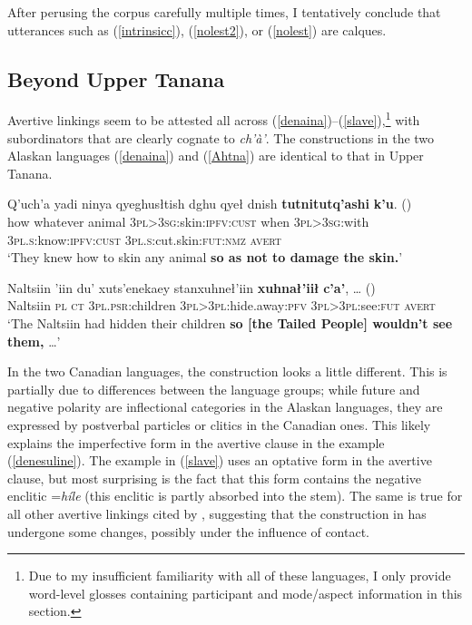 \documentclass[output=paper,colorlinks,citecolor=brown]{langscibook}
\begin{document}
After perusing the corpus carefully multiple times, I tentatively conclude that utterances such as (\ref{intrinsicc}), (\ref{nolest2}), or (\ref{nolest}) are  calques.


\subsection{Beyond Upper Tanana}
\label{subsection:avert-beyond}

Avertive linkings seem to be attested all across  (\ref{denaina})--(\ref{slave}),\footnote{Due to my insufficient familiarity with all of these languages, I only provide word-level glosses containing participant and mode/aspect information in this section.} with subordinators that are clearly cognate to  \textit{ch'à'}. The constructions in the two Alaskan languages  (\ref{denaina}) and  (\ref{Ahtna}) are identical to that in Upper Tanana.

\ea \label{denaina}
\gll  Q'uch'a yadi ninya qyeghusłtish dghu qyeł dnish \textbf{tutnitutq'ashi} \textbf{k'u}. \textnormal{()} \\
how whatever animal \textsc{3pl>3sg}:skin:\textsc{ipfv:cust} when \textsc{3pl>3sg}:with \textsc{3pl.s}:know:\textsc{ipfv:cust} \textsc{3pl.s}:cut.skin:\textsc{fut:nmz} \textsc{avert} \\
\glt `They knew how to skin any animal \textbf{so as not to damage the skin.}' \\ 
\hfill \citep[260--261]{KalifornskyP1991}
\z

\ea \label{Ahtna}
\gll  Naltsiin 'iin du' xuts'enekaey stanxuhneł'iin \textbf{xuhnał'iił} \textbf{c'a'},  {\ldots} \textnormal{()} \\
Naltsiin \textsc{pl} \textsc{ct} \textsc{3pl.psr}:children \textsc{3pl>3pl}:hide.away:\textsc{pfv} \textsc{3pl>3pl}:see:\textsc{fut} \textsc{avert} \\
\glt `The Naltsiin had hidden their children \textbf{so [the Tailed People] wouldn't see them,}  \ldots' \hfill \citep[55]{KariJ1986}
\z


 In the two Canadian languages, the construction looks a little different. This is partially due to differences between the language groups; while future and negative polarity are inflectional categories in the Alaskan languages, they are expressed by postverbal particles or clitics in the Canadian ones. This likely explains the imperfective form in the avertive clause in the  example (\ref{denesuline}). The  example in (\ref{slave}) uses an optative form in the avertive clause, but most surprising is the fact that this form contains the negative enclitic =\textit{híle} (this enclitic is partly absorbed into the stem). The same is true for all other avertive linkings cited by \citet{RiceK1989}, suggesting that the construction in  has undergone some changes, possibly under the influence of  contact.
\end{document}
